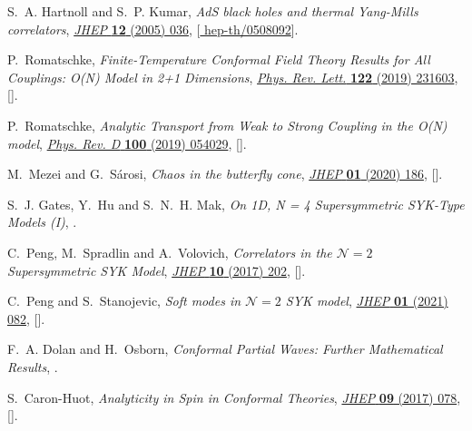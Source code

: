 \begin{thebibliography}{10}
S.~A. Hartnoll and S.~P. Kumar, \emph{{AdS black holes and thermal Yang-Mills
  correlators}},
  \href{http://dx.doi.org/10.1088/1126-6708/2005/12/036}{\emph{JHEP} {\bfseries
  12} (2005) 036}, [\href{https://arxiv.org/abs/hep-th/0508092}{{\ttfamily
  hep-th/0508092}}].

P.~Romatschke, \emph{{Finite-Temperature Conformal Field Theory Results for All
  Couplings: O(N) Model in 2+1 Dimensions}},
  \href{http://dx.doi.org/10.1103/PhysRevLett.122.231603}{\emph{Phys. Rev.
  Lett.} {\bfseries 122} (2019) 231603},
  [\href{https://arxiv.org/abs/1904.09995}{{}}].

P.~Romatschke, \emph{{Analytic Transport from Weak to Strong Coupling in the
  O(N) model}},
  \href{http://dx.doi.org/10.1103/PhysRevD.100.054029}{\emph{Phys. Rev. D}
  {\bfseries 100} (2019) 054029},
  [\href{https://arxiv.org/abs/1905.09290}{{}}].

M.~Mezei and G.~S{\'a}rosi, \emph{{Chaos in the butterfly cone}},
  \href{http://dx.doi.org/10.1007/JHEP01(2020)186}{\emph{JHEP} {\bfseries 01}
  (2020) 186}, [\href{https://arxiv.org/abs/1908.03574}{{}}].

S.~J. Gates, Y.~Hu and S.~N.~H. Mak, \emph{{On 1D, N = 4 Supersymmetric
  SYK-Type Models (I)}},  \href{https://arxiv.org/abs/2103.11899}{{}}.

C.~Peng, M.~Spradlin and A.~Volovich, \emph{{Correlators in the $\mathcal{N}=2$
  Supersymmetric SYK Model}},
  \href{http://dx.doi.org/10.1007/JHEP10(2017)202}{\emph{JHEP} {\bfseries 10}
  (2017) 202}, [\href{https://arxiv.org/abs/1706.06078}{{}}].

C.~Peng and S.~Stanojevic, \emph{{Soft modes in $\mathcal{N} = 2$ SYK model}},
  \href{http://dx.doi.org/10.1007/JHEP01(2021)082}{\emph{JHEP} {\bfseries 01}
  (2021) 082}, [\href{https://arxiv.org/abs/2006.13961}{{}}].

F.~A. Dolan and H.~Osborn, \emph{{Conformal Partial Waves: Further Mathematical
  Results}},  \href{https://arxiv.org/abs/1108.6194}{{}}.

S.~Caron-Huot, \emph{{Analyticity in Spin in Conformal Theories}},
  \href{http://dx.doi.org/10.1007/JHEP09(2017)078}{\emph{JHEP} {\bfseries 09}
  (2017) 078}, [\href{https://arxiv.org/abs/1703.00278}{{}}].


\end{thebibliography}
